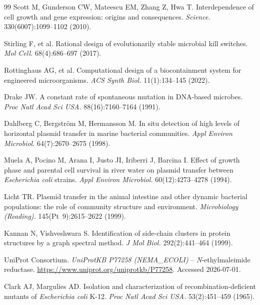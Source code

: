 \documentclass[10pt,twocolumn,letterpaper,
              colorlinks=true,
              linkcolor=blue!70!black,
              citecolor=blue!70!black,
              urlcolor=blue!70!black,
              pdfborder={0 0 0}]{article}
\begin{document}
\begin{thebibliography}{99}
Scott M, Gunderson CW, Mateescu EM, Zhang Z, Hwa T. Interdependence
of cell growth and gene expression: origins and consequences.
\textit{Science.} 330(6007):1099--1102 (2010).

Stirling F, et al. Rational design of evolutionarily stable microbial
kill switches. \textit{Mol Cell.} 68(4):686--697 (2017).

Rottinghaus AG, et al. Computational design of a biocontainment
system for engineered microorganisms. \textit{ACS Synth Biol.}
11(1):134--145 (2022).

Drake JW. A constant rate of spontaneous mutation in DNA-based
microbes. \textit{Proc Natl Acad Sci USA.} 88(16):7160--7164 (1991).

Dahlberg C, Bergstr\"{o}m M, Hermansson M. In situ detection of high
levels of horizontal plasmid transfer in marine bacterial communities.
\textit{Appl Environ Microbiol.} 64(7):2670--2675 (1998).

Muela A, Pocino M, Arana I, Justo JI, Iriberri J, Barcina I. Effect
of growth phase and parental cell survival in river water on plasmid
transfer between \textit{Escherichia coli} strains. \textit{Appl
Environ Microbiol.} 60(12):4273--4278 (1994).

Licht TR. Plasmid transfer in the animal intestine and other dynamic
bacterial populations: the role of community structure and environment.
\textit{Microbiology (Reading).} 145(Pt~9):2615--2622 (1999).

Kannan N, Vishveshwara S. Identification of side-chain clusters in
protein structures by a graph spectral method. \textit{J Mol Biol.}
292(2):441--464 (1999).

UniProt Consortium. \textit{UniProtKB P77258 (NEMA\_ECOLI)} -- \textit{N}-ethylmaleimide
reductase. \url{https://www.uniprot.org/uniprotkb/P77258}. Accessed
2026-07-01.

Clark AJ, Margulies AD. Isolation and characterization of
recombination-deficient mutants of \textit{Escherichia coli} K-12.
\textit{Proc Natl Acad Sci USA.} 53(2):451--459 (1965).

\end{thebibliography}
\end{document}
